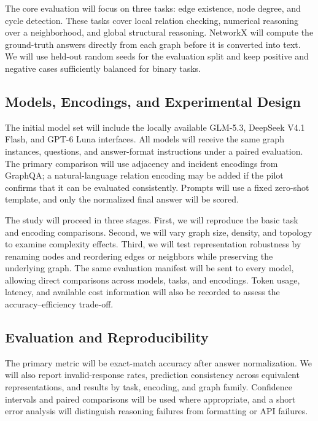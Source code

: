 \documentclass[11pt,a4paper]{article}
\begin{document}
The core evaluation will focus on three tasks: edge existence, node degree, and cycle detection. These tasks cover local relation checking, numerical reasoning over a neighborhood, and global structural reasoning. NetworkX will compute the ground-truth answers directly from each graph before it is converted into text. We will use held-out random seeds for the evaluation split and keep positive and negative cases sufficiently balanced for binary tasks.

\subsection{Models, Encodings, and Experimental Design}

The initial model set will include the locally available GLM-5.3, DeepSeek V4.1 Flash, and GPT-6 Luna interfaces. All models will receive the same graph instances, questions, and answer-format instructions under a paired evaluation. The primary comparison will use adjacency and incident encodings from GraphQA; a natural-language relation encoding may be added if the pilot confirms that it can be evaluated consistently. Prompts will use a fixed zero-shot template, and only the normalized final answer will be scored.

The study will proceed in three stages. First, we will reproduce the basic task and encoding comparisons. Second, we will vary graph size, density, and topology to examine complexity effects. Third, we will test representation robustness by renaming nodes and reordering edges or neighbors while preserving the underlying graph. The same evaluation manifest will be sent to every model, allowing direct comparisons across models, tasks, and encodings. Token usage, latency, and available cost information will also be recorded to assess the accuracy–efficiency trade-off.

\subsection{Evaluation and Reproducibility}

The primary metric will be exact-match accuracy after answer normalization. We will also report invalid-response rates, prediction consistency across equivalent representations, and results by task, encoding, and graph family. Confidence intervals and paired comparisons will be used where appropriate, and a short error analysis will distinguish reasoning failures from formatting or API failures.
\end{document}

